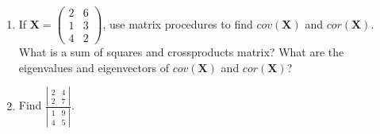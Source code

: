 \documentclass{article}
\begin{document}
\begin{enumerate}
\item If $\boldsymbol{X} = \left( \begin{array}{rr} 2 & 6\\ 1 & 3 \\ 4 & 2 \end{array} \right)$, use matrix procedures to find $cov(\boldsymbol{X})$ and $cor(\boldsymbol{X})$.   What is a sum of squares and crossproducts matrix?   What are the eigenvalues and eigenvectors of $cov(\boldsymbol{X})$ and $cor(\boldsymbol{X})$?

\item Find $\frac{\left| \begin{array}{rr} 2 & 4\\2 & 7 \end{array} \right|}{\left| \begin{array}{rr} 1 & 9\\4 & 5 \end{array} \right| }$.

\end{enumerate}
\end{document}
